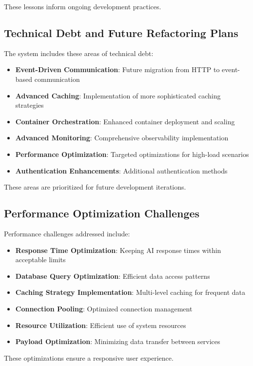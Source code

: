 These lessons inform ongoing development practices.

\subsection{Technical Debt and Future Refactoring Plans}
The system includes these areas of technical debt:
\begin{itemize}
    \item \textbf{Event-Driven Communication}: Future migration from HTTP to event-based communication
    \item \textbf{Advanced Caching}: Implementation of more sophisticated caching strategies
    \item \textbf{Container Orchestration}: Enhanced container deployment and scaling
    \item \textbf{Advanced Monitoring}: Comprehensive observability implementation
    \item \textbf{Performance Optimization}: Targeted optimizations for high-load scenarios
    \item \textbf{Authentication Enhancements}: Additional authentication methods
\end{itemize}

These areas are prioritized for future development iterations.

\subsection{Performance Optimization Challenges}
Performance challenges addressed include:
\begin{itemize}
    \item \textbf{Response Time Optimization}: Keeping AI response times within acceptable limits
    \item \textbf{Database Query Optimization}: Efficient data access patterns
    \item \textbf{Caching Strategy Implementation}: Multi-level caching for frequent data
    \item \textbf{Connection Pooling}: Optimized connection management
    \item \textbf{Resource Utilization}: Efficient use of system resources
    \item \textbf{Payload Optimization}: Minimizing data transfer between services
\end{itemize}

These optimizations ensure a responsive user experience.

